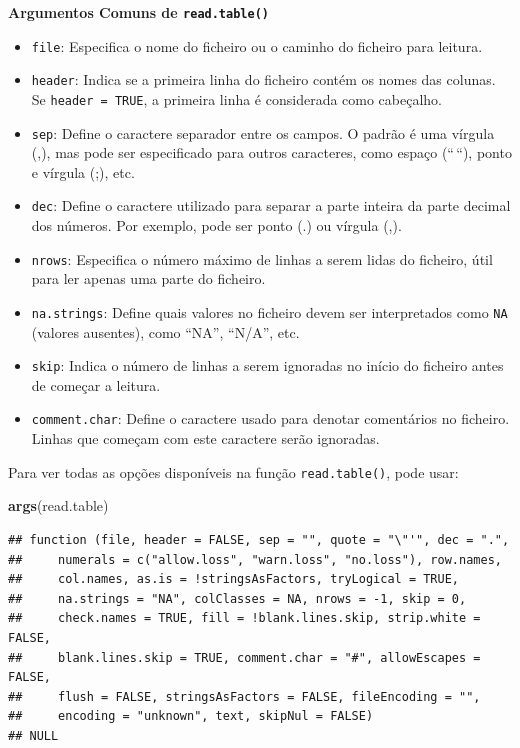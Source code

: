 \documentclass[
]{book}
\newenvironment{Shaded}{\begin{snugshade}}{\end{snugshade}}
\newcommand{\FunctionTok}[1]{\textcolor[rgb]{0.13,0.29,0.53}{\textbf{#1}}}
\newcommand{\NormalTok}[1]{#1}
\providecommand{\tightlist}{%
  \setlength{\itemsep}{0pt}\setlength{\parskip}{0pt}}
\begin{document}
\textbf{Argumentos Comuns de \texttt{read.table()}}

\begin{itemize}
\tightlist
\item
  \texttt{file}: Especifica o nome do ficheiro ou o caminho do ficheiro para
  leitura.
\item
  \texttt{header}: Indica se a primeira linha do ficheiro contém os nomes das
  colunas. Se \texttt{header\ =\ TRUE}, a primeira linha é considerada como
  cabeçalho.
\item
  \texttt{sep}: Define o caractere separador entre os campos. O padrão é uma
  vírgula (,), mas pode ser especificado para outros caracteres, como
  espaço (``\,``), ponto e vírgula (;), etc.
\item
  \texttt{dec}: Define o caractere utilizado para separar a parte inteira da
  parte decimal dos números. Por exemplo, pode ser ponto (.) ou
  vírgula (,).
\item
  \texttt{nrows}: Especifica o número máximo de linhas a serem lidas do
  ficheiro, útil para ler apenas uma parte do ficheiro.
\item
  \texttt{na.strings}: Define quais valores no ficheiro devem ser
  interpretados como \texttt{NA} (valores ausentes), como ``NA'', ``N/A'', etc.
\item
  \texttt{skip}: Indica o número de linhas a serem ignoradas no início do
  ficheiro antes de começar a leitura.
\item
  \texttt{comment.char}: Define o caractere usado para denotar comentários no
  ficheiro. Linhas que começam com este caractere serão ignoradas.
\end{itemize}

Para ver todas as opções disponíveis na função \texttt{read.table()}, pode
usar:

\begin{Shaded}
\begin{Highlighting}[]
\FunctionTok{args}\NormalTok{(read.table)}
\end{Highlighting}
\end{Shaded}

\begin{verbatim}
## function (file, header = FALSE, sep = "", quote = "\"'", dec = ".", 
##     numerals = c("allow.loss", "warn.loss", "no.loss"), row.names, 
##     col.names, as.is = !stringsAsFactors, tryLogical = TRUE, 
##     na.strings = "NA", colClasses = NA, nrows = -1, skip = 0, 
##     check.names = TRUE, fill = !blank.lines.skip, strip.white = FALSE, 
##     blank.lines.skip = TRUE, comment.char = "#", allowEscapes = FALSE, 
##     flush = FALSE, stringsAsFactors = FALSE, fileEncoding = "", 
##     encoding = "unknown", text, skipNul = FALSE) 
## NULL
\end{verbatim}
\end{document}
